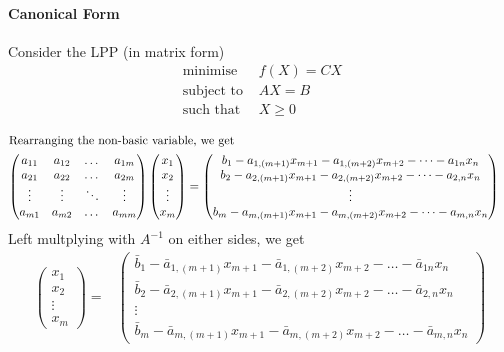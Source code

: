 \paragraph{Canonical Form}
	Consider the LPP (in matrix form)
\begin{align*}
\text{ minimise } & f(X) = CX \\
\text{ subject to } & AX = B \\
\text{ such that } & X \ge 0  
\end{align*}
\begin{commentary}
\begin{align*}
	\intertext{Rearranging the non-basic variable, we get}
	\begin{pmatrix} a_{11} & a_{12} & \dots & a_{1m} \\ a_{21} & a_{22} & \dots & a_{2m} \\ \vdots & \vdots & \ddots & \vdots \\ a_{m1} & a_{m2} & \dots & a_{mm} \end{pmatrix} \begin{pmatrix} x_1 \\ x_2 \\ \vdots \\ x_m \end{pmatrix} & = \begin{pmatrix} b_1 - a_{1,(m+1)} x_{m+1} - a_{1,(m+2)} x_{m+2} - \dots - a_{1n}x_n \\ b_2 - a_{2,(m+1)} x_{m+1} - a_{2,(m+2)} x_{m+2} - \dots - a_{2,n}x_n \\ \vdots \\ b_m-a_{m,(m+1)}x_{m+1} - a_{m,(m+2)}x_{m+2}-\dots-a_{m,n}x_n \end{pmatrix}
\end{align*}
Left multplying with $A^{-1}$ on either sides, we get
\begin{align*}
	\begin{pmatrix} x_1 \\ x_2 \\ \vdots \\ x_m \end{pmatrix} = & \begin{pmatrix} \bar{b}_1 - \bar{a}_{1,(m+1)} x_{m+1} - \bar{a}_{1,(m+2)} x_{m+2} - \dots - \bar{a}_{1n}x_n \\ \bar{b}_2 - \bar{a}_{2,(m+1)} x_{m+1} - \bar{a}_{2,(m+2)} x_{m+2} - \dots - \bar{a}_{2,n}x_n \\ \vdots \\ \bar{b}_m-\bar{a}_{m,(m+1)}x_{m+1} - \bar{a}_{m,(m+2)}x_{m+2}-\dots-\bar{a}_{m,n}x_n \end{pmatrix}\\

\end{align*}
\end{commentary}
